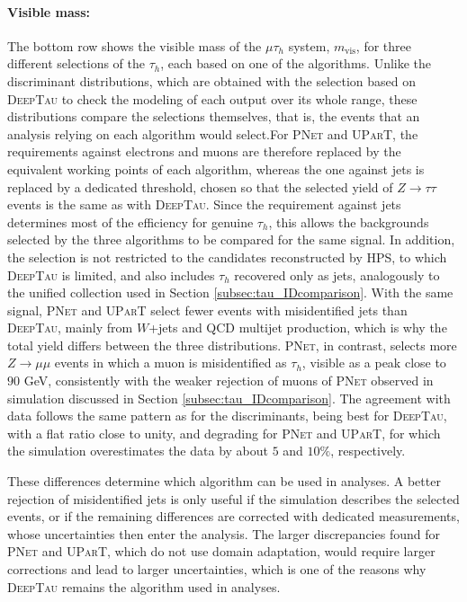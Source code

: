 \paragraph{Visible mass:} The bottom row shows the visible mass of the $\mu\tau_h$ system, $m_\text{vis}$, for three different selections of the $\tau_h$, each based on one of the algorithms. Unlike the discriminant distributions, which are obtained with the selection based on \textsc{DeepTau} to check the modeling of each output over its whole range, these distributions compare the selections themselves, that is, the events that an analysis relying on each algorithm would select.For \textsc{PNet} and \textsc{UParT}, the requirements against electrons and muons are therefore replaced by the equivalent working points of each algorithm, whereas the one against jets is replaced by a dedicated threshold, chosen so that the selected yield of $Z\to\tau\tau$ events is the same as with \textsc{DeepTau}. Since the requirement against jets determines most of the efficiency for genuine $\tau_h$, this allows the backgrounds selected by the three algorithms to be compared for the same signal. In addition, the selection is not restricted to the candidates reconstructed by HPS, to which \textsc{DeepTau} is limited, and also includes $\tau_h$ recovered only as jets, analogously to the unified collection used in Section \ref{subsec:tau_IDcomparison}. With the same signal, \textsc{PNet} and \textsc{UParT} select fewer events with misidentified jets than \textsc{DeepTau}, mainly from $W$+jets and QCD multijet production, which is why the total yield differs between the three distributions. \textsc{PNet}, in contrast, selects more $Z\to\mu\mu$ events in which a muon is misidentified as $\tau_h$, visible as a peak close to $90$ GeV, consistently with the weaker rejection of muons of \textsc{PNet} observed in simulation discussed in Section \ref{subsec:tau_IDcomparison}. The agreement with data follows the same pattern as for the discriminants, being best for \textsc{DeepTau}, with a flat ratio close to unity, and degrading for \textsc{PNet} and \textsc{UParT}, for which the simulation overestimates the data by about $5$ and $10\%$, respectively.


These differences determine which algorithm can be used in analyses. A better rejection of misidentified jets is only useful if the simulation describes the selected events, or if the remaining differences are corrected with dedicated measurements, whose uncertainties then enter the analysis. The larger discrepancies found for \textsc{PNet} and \textsc{UParT}, which do not use domain adaptation, would require larger corrections and lead to larger uncertainties, which is one of the reasons why \textsc{DeepTau} remains the algorithm used in analyses.\medskip

